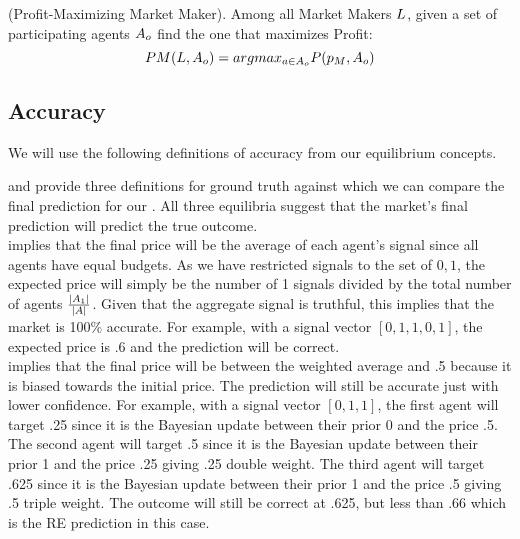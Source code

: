 \begin{definition} (Profit-Maximizing Market Maker).
\label{def:pmmm}
Among all Market Makers $L$, given a set of participating agents $A_o$ find the one that maximizes Profit:
$$ PM(L, A_o) = arg max_{a \in A_o} P(p_M, A_o)$$
\end{definition}

\subsection{Accuracy}
We will use the following definitions of accuracy from our equilibrium concepts.

 and  provide three definitions for ground truth against which we can compare the final prediction for our . All three equilibria suggest that the market's final prediction will predict the true outcome. \\

 implies that the final price will be the average of each agent's signal since all agents have equal budgets. As we have restricted signals to the set of ${0,1}$, the expected price will simply be the number of 1 signals divided by the total number of agents $\frac{|A_1|}{|A|}$. Given that the aggregate signal is truthful, this implies that the market is 100\% accurate. For example, with a signal vector $\left[0,1,1,0,1\right]$, the expected price is .6 and the prediction will be correct. \\

 implies that the final price will be between the weighted average and .5 because it is biased towards the initial price. The prediction will still be accurate just with lower confidence. For example, with a signal vector $\left[0,1,1\right]$, the first agent will target .25 since it is the Bayesian update between their prior 0 and the price .5. The second agent will target .5 since it is the Bayesian update between their prior 1 and the price .25 giving .25 double weight. The third agent will target .625 since it is the Bayesian update between their prior 1 and the price .5 giving .5 triple weight. The outcome will still be correct at .625, but less than .66 which is the RE prediction in this case.\\

